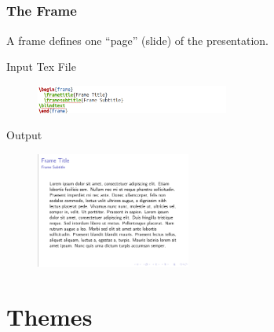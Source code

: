 \documentclass[[newPxFont]{beamer}
\begin{document}
\subsection{}
\begin{frame}
  \frametitle{The Frame}
  A frame defines one “page” (slide) of the presentation.
  \begin{block}{Input Tex File}
\begin{figure}[ht]
    \centering
    \includegraphics[width=2.5in]{figs/frame.png}
      \end{figure}
        \end{block}
\begin{block}{Output}
  \begin{figure}[ht]
    \centering
    \includegraphics[width=2in]{figs/frame_output.png} 
  \end{figure}
  \end{block}
\end{frame}
\section{Themes}
\end{document}
